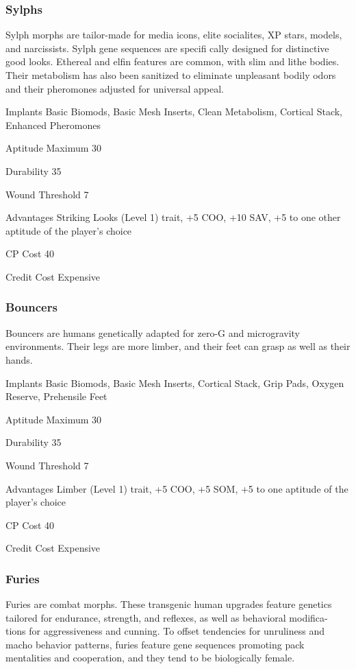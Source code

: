 \subsubsection{Sylphs}
Sylph morphs are tailor-made for media icons, elite socialites, XP stars,
models, and narcissists. Sylph gene sequences are specifi cally designed for
distinctive good looks. Ethereal and elfin features are common, with slim and
lithe bodies. Their metabolism has also been sanitized to eliminate
unpleasant bodily odors and their pheromones adjusted for universal appeal.

\begin{description*}
\item[Implants] Basic Biomods, Basic Mesh Inserts, Clean Metabolism, Cortical
  Stack, Enhanced Pheromones
\item[Aptitude Maximum] 30 
\item[Durability] 35 
\item[Wound Threshold] 7 
\item[Advantages] Striking Looks (Level 1) trait, +5 COO, +10 SAV, +5 to one
  other aptitude of the player’s choice
\item[CP Cost] 40 
\item[Credit Cost] Expensive 
\end{description*}

\subsubsection{Bouncers}
Bouncers are humans genetically adapted for zero-G and microgravity
environments. Their legs are more limber, and their feet can grasp as well as
their hands.

\begin{description*}
\item[Implants] Basic Biomods, Basic Mesh Inserts, Cortical Stack, Grip Pads,
  Oxygen Reserve, Prehensile Feet
\item[Aptitude Maximum] 30 
\item[Durability] 35 
\item[Wound Threshold] 7 
\item[Advantages] Limber (Level 1) trait, +5 COO, +5 SOM, +5 to one aptitude of
  the player’s choice
\item[CP Cost] 40 
\item[Credit Cost] Expensive 
\end{description*}

\subsubsection{Furies}
Furies are combat morphs. These transgenic human upgrades feature genetics
tailored for endurance, strength, and reflexes, as well as behavioral modifica-
tions for aggressiveness and cunning. To offset tendencies for unruliness and
macho behavior patterns, furies feature gene sequences promoting pack
mentalities and cooperation, and they tend to be biologically female.

